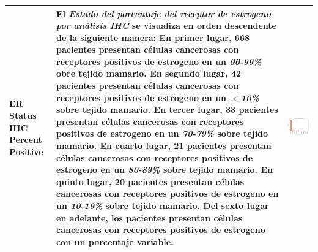 \begin{table}[!htb]
	\footnotesize
	\begin{threeparttable}
		\begin{tabular}{p{2.5cm} p{7cm} p{6.5cm}} \toprule
			ER Status IHC Percent Positive
			&El \textit{Estado del porcentaje del receptor de estrogeno por análisis IHC} se visualiza en orden descendente de la siguiente manera: En primer lugar, 668 pacientes presentan células cancerosas con receptores positivos de estrogeno en un \textit{90-99\%} obre tejido mamario. En segundo lugar, 42 pacientes presentan células cancerosas con receptores positivos de estrogeno en un $<$\textit{10\%} sobre tejido mamario. En tercer lugar, 33 pacientes presentan células cancerosas con receptores positivos de estrogeno en un \textit{70-79\%} sobre tejido mamario. En cuarto lugar, 21 pacientes presentan células cancerosas con receptores positivos de estrogeno en un \textit{80-89\%} sobre tejido mamario. En quinto lugar, 20 pacientes presentan células cancerosas con receptores positivos de estrogeno en un \textit{10-19\%} sobre tejido mamario. Del sexto lugar en adelante, los pacientes presentan células cancerosas con receptores positivos de estrogeno con un porcentaje variable.
			& \begin{center}\includegraphics[width=1\linewidth]{NOTEBOOK/IMAGENES_DESCRIPTIVAS/12_er_status_ihc_percent_positive}\end{center}
			\\ \hline

\end{tabular}
\end{threeparttable}
\end{table}
